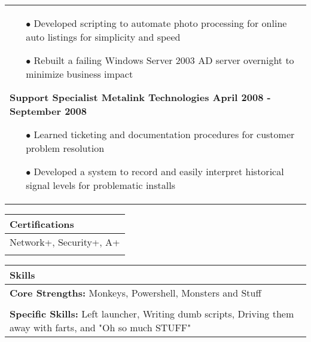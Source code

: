 \documentclass{article}
\begin{document}
\begin{tabular}{p{\dimexpr\linewidth-2\tabcolsep}}
\begin{itemize}
	\item[$\bullet$]Developed scripting to automate photo processing for online auto listings for simplicity and speed
	\item[$\bullet$]Rebuilt a failing Windows Server 2003 AD server overnight to minimize business impact
 \end{itemize}
   {\bfseries Support Specialist \hfill Metalink Technologies \quad \qquad April 2008 - September 2008}
 \begin{itemize}
 	\item[$\bullet$]Learned ticketing and documentation procedures for customer problem resolution
 	\item[$\bullet$]Developed a system to record and easily interpret historical signal levels for problematic installs
 \end{itemize}
\end{tabular}
\begin{tabular}{p{\dimexpr\linewidth-2\tabcolsep}}
	\textbf{Certifications} \\
	\hline
	\textnormal{Network+, Security+, A+} \\
	\\
\end{tabular}
\begin{tabular}{p{\dimexpr\linewidth-2\tabcolsep}}
	\textbf{Skills} \\
	\hline
	\textbf{Core Strengths:} \textnormal{Monkeys, Powershell, Monsters and Stuff} \\
	\\
	\textbf{Specific Skills:} \textnormal{Left launcher, Writing dumb scripts, Driving them away with farts, and "Oh so much STUFF"}
\end{tabular}
\end{document}
